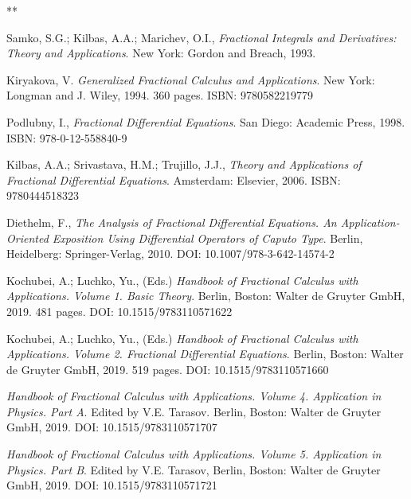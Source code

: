 \documentclass[12pt]{article}
\begin{document}
\begin{thebibliography}{**}


 Samko, S.G.; Kilbas, A.A.; Marichev, O.I., 
\textit{Fractional Integrals and Derivatives: Theory and Applications}. 
New York: Gordon and Breach, 1993. 

 Kiryakova, V. 
\textit{Generalized Fractional Calculus and Applications}. 
New York: Longman and J. Wiley, 1994. 360 pages. 
ISBN: 9780582219779

 Podlubny, I., 
\textit{Fractional Differential Equations}. 
San Diego: Academic Press, 1998.
ISBN: 978-0-12-558840-9

 Kilbas, A.A.; Srivastava, H.M.; Trujillo, J.J., \textit{Theory and Applications of Fractional 
Differential Equations}. 
Amsterdam: Elsevier, 2006. 
ISBN: 9780444518323

 Diethelm, F., 
\textit{The Analysis of Fractional Differential Equations.
An Application-Oriented Exposition Using
Differential Operators of Caputo Type}. 
Berlin, Heidelberg: Springer-Verlag, 2010.
DOI: 10.1007/978-3-642-14574-2 

 Kochubei, A.; Luchko, Yu., (Eds.)
\textit{Handbook of Fractional Calculus with Applications. Volume 1. Basic Theory}. 
Berlin, Boston: Walter de Gruyter GmbH, 2019. 481 pages. 
DOI: 10.1515/9783110571622

 Kochubei, A.; Luchko, Yu., (Eds.)
\textit{Handbook of Fractional Calculus with Applications. Volume 2. Fractional Differential Equations}. 
Berlin, Boston: Walter de Gruyter GmbH, 2019. 519 pages. 
DOI: 10.1515/9783110571660


\textit{Handbook of Fractional Calculus with Applications. 
Volume 4. Application in Physics. Part A}. 
Edited by V.E. Tarasov. 
Berlin, Boston: Walter de Gruyter GmbH, 2019. 
DOI: 10.1515/9783110571707 

\textit{Handbook of Fractional Calculus with Applications. Volume 5. Application in Physics. Part B}. 
Edited by V.E. Tarasov, 
Berlin, Boston: Walter de Gruyter GmbH, 2019. 
DOI: 10.1515/9783110571721


\end{thebibliography}
\end{document}
